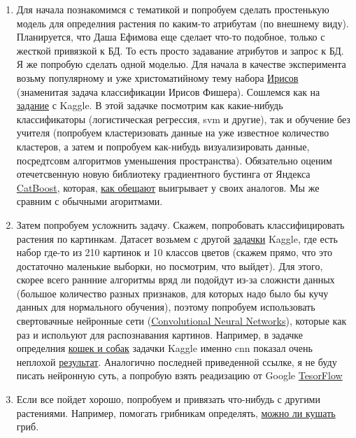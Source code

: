 \documentclass[11pt]{article}
\providecommand{\tightlist}{%
      \setlength{\itemsep}{0pt}\setlength{\parskip}{0pt}}
\begin{document}
    \begin{enumerate}
\def\labelenumi{\arabic{enumi}.}
\tightlist
\item
  Для начала познакомимся с тематикой и попробуем сделать простенькую
  модель для определния растения по каким-то атрибутам (по внешнему
  виду). Планируется, что Даша Ефимова еще сделает что-то подобное,
  только с жесткой привязкой к БД. То есть просто задавание атрибутов и
  запрос к БД. Я же попробую сделать одной моделью. Для начала в
  качестве эксперимента возьму популярному и уже христоматийному тему
  набора
  \href{https://en.wikipedia.org/wiki/Iris_flower_data_set}{Ирисов}
  (знаменитая задача классификации Ирисов Фишера). Сошлемся как на
  \href{https://www.kaggle.com/uciml/iris}{задание} с Kaggle. В этой
  задачке посмотрим как какие-нибудь классификаторы (логистическая
  регрессия, svm и другие), так и обучение без учителя (попробуем
  кластеризовать данные на уже известное количество кластеров, а затем и
  попробуем как-нибудь визуализировать данные, посредтсовм алгоритмов
  уменьшения пространства). Обязательно оценим отечетсвенную новую
  библиотеку градиентного бустинга от Яндекса
  \href{https://tech.yandex.ru/catboost/}{CatBoost}, которая,
  \href{https://catboost.yandex/\#benchmark}{как обещают} выигрывает у
  своих аналогов. Мы же сравним с обычными агоритмами.
\item
  Затем попробуем усложнить задачу. Скажем, попробовать классифицировать
  растения по картинкам. Датасет возьмем с другой
  \href{https://www.kaggle.com/olgabelitskaya/the-dataset-of-flower-images/data}{задачки}
  Kaggle, где есть набор где-то из 210 картинок и 10 классов цветов
  (скажем прямо, что это достаточно маленькие выборки, но посмотрим, что
  выйдет). Для этого, скорее всего раннние алгоритмы вряд ли подойдут
  из-за сложнсти данных (большое количество разных признаков, для
  которых надо было бы кучу данных для нормального обучения), поэтому
  попробуем использовать свертовачные нейронные сети
  (\href{http://cs231n.github.io/convolutional-networks/}{Convolutional
  Neural Networks}), которые как раз и испольуют для распознавания
  картинов. Например, в задачке определния
  \href{https://www.kaggle.com/c/dogs-vs-cats/rules}{кошек и собак}
  задачки Kaggle именно cnn показал очень неплохой
  \href{http://www.subsubroutine.com/sub-subroutine/2016/9/30/cats-and-dogs-and-convolutional-neural-networks}{результат}.
  Аналогично последней приведенной ссылке, я не буду писать нейронную
  суть, а попробую взять реадизацию от Google
  \href{https://www.tensorflow.org/}{TesorFlow}
\item
  Если все пойдет хорошо, попробуем и привязать что-нибудь с другими
  растениями. Например, помогать грибникам определять,
  \href{https://www.kaggle.com/uciml/mushroom-classification/data}{можно
  ли кушать} гриб.
\end{enumerate}
\end{document}
